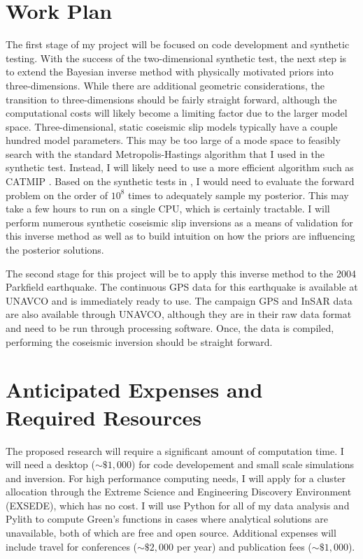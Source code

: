 \documentclass[12pt]{article}
\begin{document}
\section*{Work Plan}
The first stage of my project will be focused on code development and synthetic testing.  With the success of the two-dimensional synthetic test, the next step is to extend the Bayesian inverse method with physically motivated priors into three-dimensions.  While there are additional geometric considerations, the transition to three-dimensions should be fairly straight forward, although the computational costs will likely become a limiting factor due to the larger model space.  Three-dimensional, static coseismic slip models typically have a couple hundred model parameters.  This may be too large of a mode space to feasibly search with the standard Metropolis-Hastings algorithm that I used in the synthetic test.  Instead, I will likely need to use a more efficient algorithm such as CATMIP \citep{Minson2013}.  Based on the synthetic tests in \citep{Minson2013}, I would need to evaluate the forward problem on the order of $10^{8}$ times to adequately sample my posterior.  This may take a few hours to run on a single CPU, which is certainly tractable.  I will perform numerous synthetic coseismic slip inversions as a means of validation for this inverse method as well as to build intuition on how the priors are influencing the posterior solutions.

The second stage for this project will be to apply this inverse method to the 2004 Parkfield earthquake.  The continuous GPS data for this earthquake is available at UNAVCO and is immediately ready to use.  The campaign GPS and InSAR data are also available through UNAVCO, although they are in their raw data format and need to be run through processing software. Once, the data is compiled, performing the coseismic inversion should be straight forward.        

\section*{Anticipated Expenses and Required Resources}
The proposed research will require a significant amount of computation time.  I will need a desktop (${\sim}\$1,000$) for code developement and small scale simulations and inversion.  For high performance computing needs, I will apply for a cluster allocation through the Extreme Science and Engineering Discovery Environment (EXSEDE), which has no cost.  I will use Python for all of my data analysis and Pylith \citep{Aagaard2009} to compute Green's functions in cases where analytical solutions are unavailable, both of which are free and open source.  Additional expenses will include travel for conferences (${\sim}\$2,000$ per year) and publication fees (${\sim}\$1,000$).  



%


\end{document}
